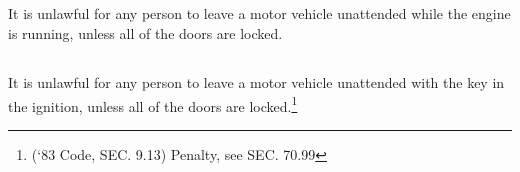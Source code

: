 \subsection{}
It is unlawful for any person to leave a motor vehicle unattended while the engine is running, unless all of the doors are locked.
\subsection{}
It is unlawful for any person to leave a motor vehicle unattended with the key in the ignition, unless all of the doors are locked.\footnote{(‘83 Code, SEC. 9.13)  Penalty, see SEC. 70.99}
